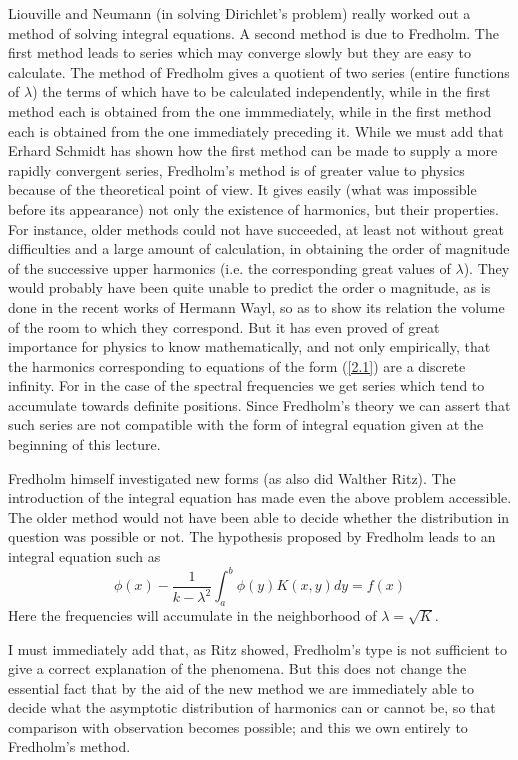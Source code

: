 \documentclass[12pt,oneside]{book}
\begin{document}
Liouville and Neumann (in solving Dirichlet's problem) really worked out a method of solving integral equations. A second method is due to Fredholm. The first method leads to series which may converge slowly but they are easy to calculate. The method of Fredholm gives a quotient of two series (entire functions of $\lambda$) the terms of which have to be calculated independently, while in the first method each is obtained from the one immmediately, while in the first method each is obtained from the one immediately preceding it. While we must add that Erhard Schmidt has shown how the first method can be made to supply a more rapidly convergent series, Fredholm's method is of greater value to physics because of the theoretical point of view. It gives easily (what was impossible before its appearance) not only the existence of harmonics, but their properties. For instance, older methods could not have succeeded, at least not without great difficulties and a large amount of calculation, in obtaining the order of magnitude of the successive upper harmonics (i.e. the corresponding great values of $\lambda$). They would probably have been quite unable to predict the order o magnitude, as is done in the recent works of Hermann Wayl, so as to show its relation the volume of the room to which they correspond. But it has even proved of great importance for physics to know mathematically, and not only empirically, that the harmonics corresponding to equations of the form (\ref{2.1}) are a discrete infinity. For in the case of the spectral frequencies we get series which tend to accumulate towards definite positions. Since Fredholm's theory we can assert that such series are not compatible with the form of integral equation given at the beginning of this lecture. \par 

Fredholm himself investigated new forms (as also did Walther Ritz). The introduction of the integral equation has made even the above problem accessible. The older method would not have been able to decide whether the distribution in question was possible or not. The hypothesis proposed by Fredholm leads to an integral equation such as 
\begin{equation}
    \label{2.2}
    \phi(x)-\frac{1}{k-\lambda^2}\int_a^b\phi(y)K(x,y)dy=f(x)
\end{equation}
Here the frequencies will accumulate in the neighborhood of $\lambda=\sqrt{K}$. \par 

I must immediately add that, as Ritz showed, Fredholm's type is not sufficient to give a correct explanation of the phenomena. But this does not change the essential fact that by the aid of the new method we are immediately able to decide what the asymptotic distribution of harmonics can or cannot be, so that comparison with observation becomes possible; and this we own entirely to Fredholm's method. \par 
\end{document}
